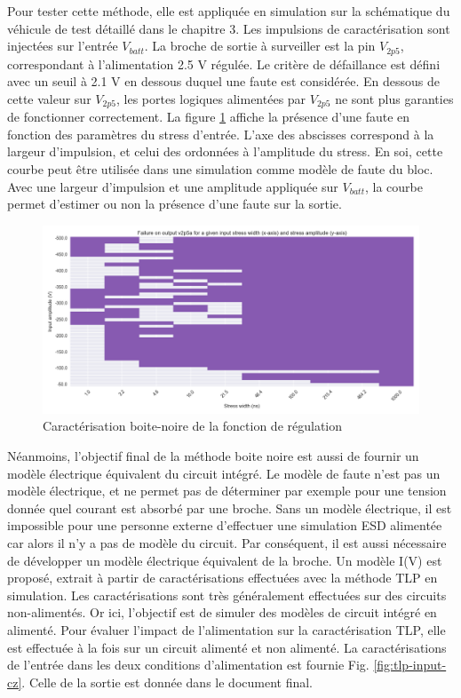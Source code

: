 Pour tester cette méthode, elle est appliquée en simulation sur la schématique du véhicule de test détaillé dans le chapitre 3.
Les impulsions de caractérisation sont injectées sur l'entrée $V_{batt}$.
La broche de sortie à surveiller est la pin $V_{2p5}$, correspondant à l'alimentation 2.5 V régulée.
Le critère de défaillance est défini avec un seuil à 2.1 V en dessous duquel une faute est considérée.
En dessous de cette valeur sur $V_{2p5}$, les portes logiques alimentées par $V_{2p5}$ ne sont plus garanties de fonctionner correctement.
La figure \ref{fig:cz-black-box} affiche la présence d'une faute en fonction des paramètres du stress d'entrée.
L'axe des abscisses correspond à la largeur d'impulsion, et celui des ordonnées à l'amplitude du stress.
En soi, cette courbe peut être utilisée dans une simulation comme modèle de faute du bloc.
Avec une largeur d'impulsion et une amplitude appliquée sur $V_{batt}$, la courbe permet d'estimer ou non la présence d'une faute sur la sortie.

\begin{figure}[!h]
  \centering
  \includegraphics[width=\textwidth]{src/1/figures/black_box_regulator.png}
  \caption{Caractérisation boite-noire de la fonction de régulation}
  \label{fig:cz-black-box}
\end{figure}

Néanmoins, l'objectif final de la méthode boite noire est aussi de fournir un modèle électrique équivalent du circuit intégré.
Le modèle de faute n'est pas un modèle électrique, et ne permet pas de déterminer par exemple pour une tension donnée quel courant est absorbé par une broche.
Sans un modèle électrique, il est impossible pour une personne externe d'effectuer une simulation ESD alimentée car alors il n'y a pas de modèle du circuit.
Par conséquent, il est aussi nécessaire de développer un modèle électrique équivalent de la broche.
Un modèle I(V) est proposé, extrait à partir de caractérisations effectuées avec la méthode TLP en simulation.
Les caractérisations sont très généralement effectuées sur des circuits non-alimentés.
Or ici, l'objectif est de simuler des modèles de circuit intégré en alimenté.
Pour évaluer l'impact de l'alimentation sur la caractérisation TLP, elle est effectuée à la fois sur un circuit alimenté et non alimenté.
La caractérisations de l'entrée dans les deux conditions d'alimentation est fournie Fig. \ref{fig:tlp-input-cz}.
Celle de la sortie est donnée dans le document final.

